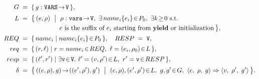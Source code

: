 \[
\begin{aligned}
	G \;&=\; \{\, g : \texttt{VARS}\!\to\! \texttt{V} \,\},\\[0.3ex]
	L \;&=\; \bigl\{\, (e,\rho)\ \bigm|\ \rho:\texttt{vars}\!\to\! \texttt{V},\ \exists\,name_i\{e_i\}\!\in\! P_0,\ \exists k\!\ge\!0\ \text{s.t.} \\[-0.2ex]
	&\qquad\quad\qquad\quad e \text{ is the suffix of } e_i \text{ starting from } \yieldkw \text{ or initialization} \,\bigr\},\\[0.3ex]
	REQ \;&=\; \{\, name_i \mid name_i\{e_i\}\!\in\! P_0 \,\},\quad RESP \;=\; \texttt{V},\\[0.3ex]
	req \;&=\; \{\, (r,\ell) \mid r=name_i\!\in\!REQ,\ \ell=(e_i,\rho_0)\!\in\!L \,\},\\[0.3ex]
	resp \;&=\; \{\, (\ell',r') \mid \exists \texttt{v}\!\in\!\texttt{V}.\ \ell'=(v,\rho')\!\in\!L,\ r'=\texttt{v}\!\in\!RESP \,\},\\[0.3ex]
	\delta \;&=\; \bigl\{\, ((e,\rho),g)\!\to\!((e',\rho'),g') \ \bigm|\ (e,\rho),(e',\rho')\!\in\!L,\ g,g'\!\in\!G,\ 
	\cfg{e}{\rho}{g} \pstep \cfg{v}{\rho'}{g'} \,\bigr\}.
\end{aligned}
\]


%
%	
%
%	
%	
%	
%	
%	
%



